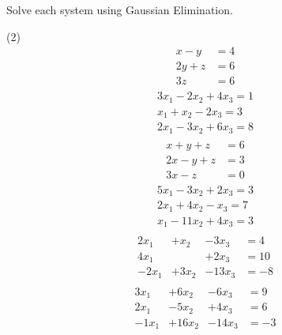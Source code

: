 \documentclass[12pt,fleqn]{book}
\newcommand{\prb}[1]{\begin{Exercise}#1\end{Exercise}}
\begin{document}
\prb{Solve each system using Gaussian Elimination.
	\begin{tasks}(2)
		\task \vspace{-2.4em}
		\begin{align*}
			x-y  & =4 \\
			2y+z & =6 \\
			3z   & =6
		\end{align*}
		\task \vspace{-2.4em}
		\begin{align*}
			\begin{array}{r}
				3 x_{1}-2 x_{2}+4 x_{3}=1 \\
				x_{1}+x_{2}-2 x_{3}=3     \\
				2 x_{1}-3 x_{2}+6 x_{3}=8
			\end{array}
		\end{align*}
		\vspace{4in}
		\task \vspace{-2.4em}
		\begin{align*}
			x+y+z  & =6 \\
			2x-y+z & =3 \\
			3x-z   & =0
		\end{align*}
		\task \vspace{-2.4em}
		\begin{align*}
			\begin{array}{r}
				5 x_{1}-3 x_{2}+2 x_{3}=3 \\
				2 x_{1}+4 x_{2}-x_{3}=7   \\
				x_{1}-11 x_{2}+4 x_{3}=3
			\end{array}
		\end{align*}
		\vspace{4in}
		\task \vspace{-2.4em}
		\begin{align*}
			\begin{array}{rrrr}
				2 x_{1} & +x_{2}  & -3x_{3}  & =4  \\
				4 x_{1} &         & +2x_{3}  & =10 \\
				-2x_{1} & +3x_{2} & -13x_{3} & =-8
			\end{array}
		\end{align*}
		\task \vspace{-2.4em}
		\begin{align*}
			\begin{array}{rrrr}
				3 x_{1} & + 6x_{2} & -6x_{3}  & =9  \\
				2 x_{1} & - 5x_{2} & +4x_{3}  & =6  \\
				-1x_{1} & +16x_{2} & -14x_{3} & =-3
			\end{array}
		\end{align*}
	\end{tasks}
}
\end{document}
